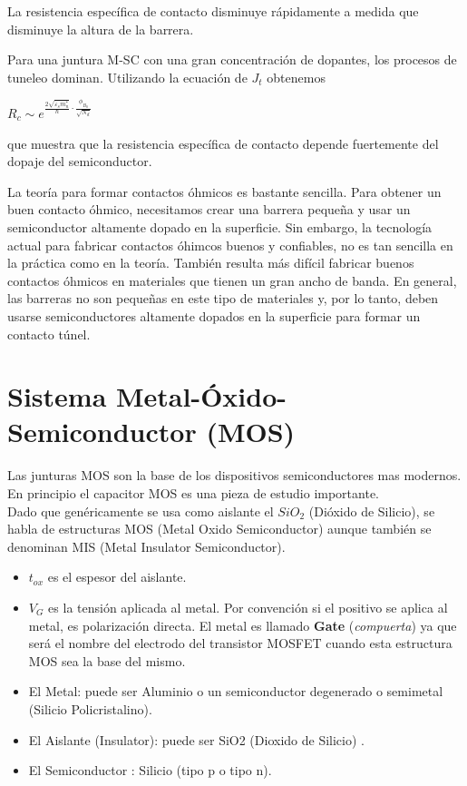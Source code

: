 \documentclass[oneside]{book}
\numberwithin{equation}{section}
\numberwithin{figure}{section}
\numberwithin{table}{section}
\begin{document}
				La resistencia específica de contacto disminuye rápidamente a medida que disminuye la altura de la barrera.

				Para una juntura M-SC con una gran concentración de dopantes, los procesos de tuneleo dominan. Utilizando la ecuación de $J_{t}$ obtenemos
				
				\begin{center}
					$R_c \sim e^{\frac{2\sqrt{\varepsilon_s m^{\ast}_n}}{\hbar} \cdot \frac{\phi_{B_0}}{\sqrt{N_d}}}$
				\end{center}
				
				que muestra que la resistencia específica de contacto depende fuertemente del dopaje del semiconductor.

				La teoría para formar contactos óhmicos es bastante sencilla. Para obtener un buen contacto óhmico, necesitamos crear una barrera pequeña y usar un semiconductor altamente dopado en la superficie. Sin embargo, la tecnología actual para fabricar contactos óhimcos buenos y confiables, no es tan sencilla en la práctica como en la teoría. También resulta más difícil fabricar buenos contactos óhmicos en materiales que tienen un gran ancho de banda. En general, las barreras no son pequeñas en este tipo de materiales y, por lo tanto, deben usarse semiconductores altamente dopados en la superficie para formar un contacto túnel.

		\section{Sistema Metal-Óxido-Semiconductor (MOS)}
		
			Las junturas MOS son la base de los dispositivos semiconductores mas modernos. En principio el capacitor MOS es una pieza de estudio importante.\\
			
			Dado que genéricamente se usa como aislante el $SiO_2$ (Dióxido de Silicio), se habla de estructuras MOS (Metal Oxido Semiconductor) aunque también se denominan MIS (Metal Insulator Semiconductor).\\
			
			\begin{itemize}
				\item $t_{ox}$ es el espesor del aislante.
				\item $V_G$ es la tensión aplicada al metal. Por convención si el positivo se aplica al metal, es polarización directa. El metal es llamado \textbf{Gate} (\textit{compuerta}) ya que será el nombre del electrodo del transistor MOSFET cuando esta estructura MOS sea la base del mismo.
				\item El Metal: puede ser Aluminio o un semiconductor degenerado o semimetal (Silicio Policristalino).
				\item El Aislante (Insulator): puede ser SiO2 (Dioxido de Silicio) .
				\item El Semiconductor : Silicio (tipo p o tipo n).
			\end{itemize}
			
\end{document}
